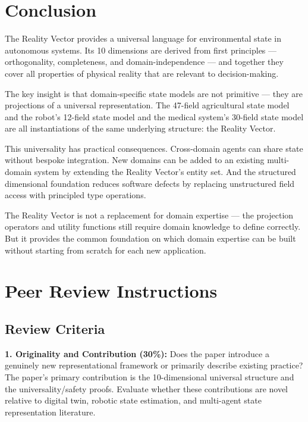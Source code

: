 \documentclass[12pt]{article}
\begin{document}
\section{Conclusion}
\label{sec:conclusion}

The Reality Vector provides a universal language for environmental state in autonomous systems. Its 10 dimensions are derived from first principles --- orthogonality, completeness, and domain-independence --- and together they cover all properties of physical reality that are relevant to decision-making.

The key insight is that domain-specific state models are not primitive --- they are projections of a universal representation. The 47-field agricultural state model and the robot's 12-field state model and the medical system's 30-field state model are all instantiations of the same underlying structure: the Reality Vector.

This universality has practical consequences. Cross-domain agents can share state without bespoke integration. New domains can be added to an existing multi-domain system by extending the Reality Vector's entity set. And the structured dimensional foundation reduces software defects by replacing unstructured field access with principled type operations.

The Reality Vector is not a replacement for domain expertise --- the projection operators and utility functions still require domain knowledge to define correctly. But it provides the common foundation on which domain expertise can be built without starting from scratch for each new application.

\section*{Peer Review Instructions}
\label{sec:peer-review}

\subsection*{Review Criteria}

\textbf{1. Originality and Contribution (30\%):} Does the paper introduce a genuinely new representational framework or primarily describe existing practice? The paper's primary contribution is the 10-dimensional universal structure and the universality/safety proofs. Evaluate whether these contributions are novel relative to digital twin, robotic state estimation, and multi-agent state representation literature.
\end{document}
